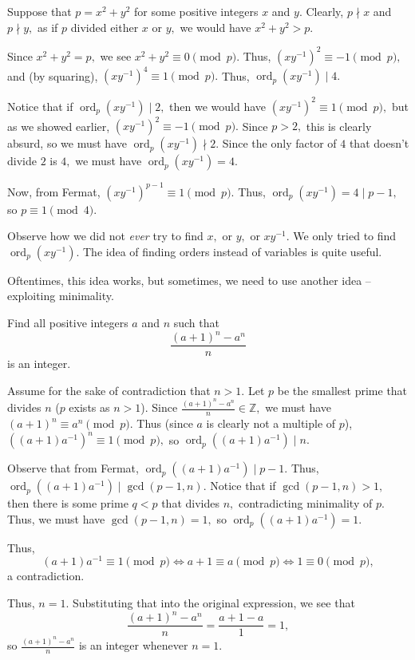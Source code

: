 \documentclass[blue,onecol]{shooting}
\begin{document}
\begin{sol}
Suppose that $p = x^2+y^2$ for some positive integers $x$ and $y.$ Clearly, $p \nmid x$ and $p \nmid y,$ as if $p$ divided either $x$ or $y,$ we would have $x^2+y^2 > p.$ 

Since $x^2+y^2 = p,$ we see $x^2 + y^2 \equiv 0 \pmod{p}.$ Thus, $(x y^{-1})^2 \equiv -1 \pmod{p},$ and (by squaring), $(xy^{-1})^4 \equiv 1 \pmod{p}.$ Thus, $\operatorname{ord}_p(xy^{-1}) \mid 4.$

Notice that if $\operatorname{ord}_p(xy^{-1}) \mid 2,$ then we would have $(xy^{-1})^2 \equiv 1 \pmod{p},$ but as we showed earlier, $(xy^{-1})^2 \equiv -1 \pmod{p}.$ Since $p > 2,$ this is clearly absurd, so we must have $\operatorname{ord}_p(xy^{-1}) \nmid 2.$ Since the only factor of $4$ that doesn't divide $2$ is $4,$ we must have $\operatorname{ord}_p(xy^{-1}) = 4.$

Now, from Fermat, $(xy^{-1})^{p-1} \equiv 1 \pmod{p}.$ Thus, $\operatorname{ord}_p(xy^{-1}) = 4 \mid p-1,$ so $p \equiv 1 \pmod{4}.$
\end{sol}

Observe how we did not \emph{ever} try to find $x,$ or $y,$ or $xy^{-1}.$ We only tried to find $\operatorname{ord}_p(xy^{-1}).$ The idea of finding orders instead of variables is quite useful.

Oftentimes, this idea works, but sometimes, we need to use another idea -- exploiting minimality.

\begin{exam}
Find all positive integers $a$ and $n$ such that $$\frac{(a+1)^n - a^n}{n}$$ is an integer.
\end{exam}

\begin{sol}
Assume for the sake of contradiction that $n>1.$ Let $p$ be the smallest prime that divides $n$ ($p$ exists as $n>1$). Since $\frac{(a+1)^n - a^n}{n} \in \mathbb{Z},$ we must have $(a+1)^{n} \equiv a^{n} \pmod{p}.$ Thus (since $a$ is clearly not a multiple of $p$), $((a+1)a^{-1})^{n} \equiv 1 \pmod{p},$ so $\operatorname{ord}_p((a+1)a^{-1}) \mid n.$

Observe that from Fermat, $\operatorname{ord}_p((a+1)a^{-1}) \mid p-1.$ Thus, $\operatorname{ord}_p((a+1)a^{-1}) \mid \gcd(p-1, n).$ Notice that if $\gcd(p-1, n) > 1,$ then there is some prime $q < p$ that divides $n,$ contradicting minimality of $p.$ Thus, we must have $\gcd(p-1, n) = 1,$ so $\operatorname{ord}_p((a+1)a^{-1}) = 1.$

Thus, $$(a+1)a^{-1} \equiv 1 \pmod{p} \Longleftrightarrow a+1 \equiv a \pmod{p} \Longleftrightarrow 1 \equiv 0 \pmod{p},$$ a contradiction. 

Thus, $n = 1.$ Substituting that into the original expression, we see that $$\frac{(a+1)^n-a^n}{n} = \frac{a+1-a}{1} = 1,$$ so $\frac{(a+1)^n-a^n}{n}$ is an integer whenever $n = 1.$
\end{sol}
\end{document}
